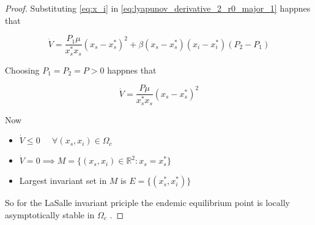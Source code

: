 \begin{proof}
Substituting \ref{eq:x_i} in \ref{eq:lyapunov_derivative_2_r0_major_1} happnes that

\begin{equation}
    \label{eq:lyapunov_derivative_3_r0_major_1}
    \dot{V} = \frac{P_1 \mu}{x_s^* x_s} \left( x_s - x_s^* \right)^2 + \beta \left( x_s - x_s^* \right)\left( x_i - x_i^* \right)\left( P_2 - P_1 \right)
\end{equation}

Choosing $P_1 = P_2 = P > 0$ happnes that

\begin{equation}
    \label{eq:lyapunov_derivative_4_r0_major_1}
    \dot{V} = \frac{P\mu}{x_s^* x_s} \left( x_s - x_s^* \right)^2
\end{equation}

Now
\begin{itemize}
    \item $ \dot{V} \leq 0 \;\;\;\;\; \forall \left( x_s, x_i \right) \in \Omega_c$
    \item $ \dot{V} = 0 \implies M = \{(x_s,x_i) \in\mathbb{R}^2: x_s = x_s^*\}$
    \item Largest invariant set in $M$ is $E = \{(x_s^*,x_i^*)\}$
\end{itemize}

So for the LaSalle invariant priciple the endemic equilibrium point is locally asymptotically stable in $\Omega_c$ \cite[p.128]{bib:khalil}.
\end{proof}
